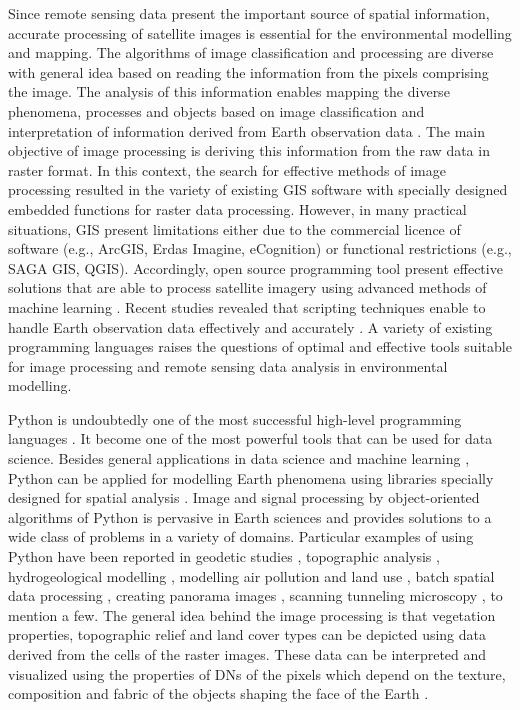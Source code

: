 \documentclass[ijgi,article,submit,pdftex,moreauthors]{Definitions/mdpi}
\begin{document}
Since remote sensing data present the important source of spatial information, accurate processing of satellite images is essential for the environmental modelling and mapping. The algorithms of image classification and processing are diverse with general idea based on reading the information from the pixels comprising the image. The analysis of this information enables mapping the diverse phenomena, processes and objects based on image classification and interpretation of information derived from Earth observation data \cite{PERIN2021106694,PAHLEVAN2022112860,Lemenkova202141,ABU2021107863,ATTOUMANE2022103285}. The main objective of image processing is deriving this information from the raw data in raster format. In this context, the search for effective methods of image processing resulted in the variety of existing GIS software with specially designed embedded functions for raster data processing. However, in many practical situations, GIS present limitations either due to the commercial licence of software (e.g., ArcGIS, Erdas Imagine, eCognition) or functional restrictions (e.g., SAGA GIS, QGIS). Accordingly, open source programming tool present effective solutions that are able to process satellite imagery using advanced methods of machine learning \cite{MASOLELE2021112600,9066075,MARTINS2022113203,rs71114876}. Recent studies revealed that scripting techniques enable to handle Earth observation data effectively and accurately \cite{6344536,ELLEFSEN20191171,Lemenkova202212,6910592,Lemenkova202215,4160259}. A variety of existing programming languages raises the questions of optimal and effective tools suitable for image processing and remote sensing data analysis in environmental modelling. 

Python is undoubtedly one of the most successful high-level programming languages \cite{van1995python}. It become one of the most powerful tools that can be used for data science. Besides general applications in data science and machine learning \cite{8757088,DebeirDecaestecker,Debeir2008,9719489}, Python can be applied for modelling Earth phenomena using libraries specially designed for spatial analysis \cite{Ahmed}. Image and signal processing by object-oriented algorithms of Python is pervasive in Earth sciences and provides solutions to a wide class of problems in a variety of domains. Particular examples of using Python have been reported in geodetic studies \cite{Zhou2021GPS2spaceAO}, topographic analysis \cite{9254627}, hydrogeological modelling \cite{Mogaji}, modelling air pollution and land use \cite{Maetal2020}, batch spatial data processing \cite{6057428}, creating panorama images \cite{JASKOLKA2019e02560}, scanning tunneling microscopy \cite{BASTIDAS2021150821}, to mention a few. The general idea behind the image processing is that vegetation properties, topographic relief and land cover types can be depicted using data derived from the cells of the raster images. These data can be interpreted and visualized using the properties of DNs of the pixels which depend on the texture, composition and fabric of the objects shaping the face of the Earth \cite{YUAN2022106966}. 
\end{document}
